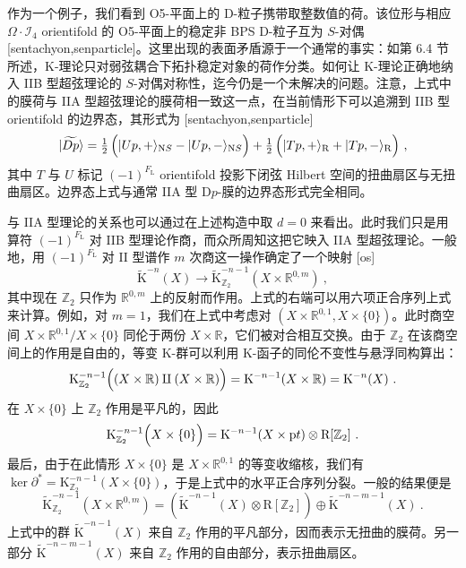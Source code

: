 \documentclass[11pt,a4paper]{ctexart}
\begin{document}
作为一个例子，我们看到 O5-平面上的 D-粒子携带取整数值的荷。该位形与相应 \(\Omega\cdot{\mathcal I}_4\) orientifold 的 O5-平面上的稳定非 BPS D-粒子互为 \(S\)-对偶 [sentachyon,senparticle]。这里出现的表面矛盾源于一个通常的事实：如第 6.4 节所述，K-理论只对弱弦耦合下拓扑稳定对象的荷作分类。如何让 K-理论正确地纳入 IIB 型超弦理论的 \(S\)-对偶对称性，迄今仍是一个未解决的问题。注意，上式中的膜荷与 IIA 型超弦理论的膜荷相一致这一点，在当前情形下可以追溯到 IIB 型 orientifold 的边界态，其形式为 [sentachyon,senparticle] \[|\widetilde{Dp}\rangle
=\mbox{$\frac{1}{2}$}\,\Bigl(|Up,+\rangle_{{\mathrm NS}}-|Up,-\rangle_{{\mathrm NS}}\Bigr)
+\mbox{$\frac{1}{2}$}\,\Bigl(|Tp,+\rangle_{{\mathrm R}}+|Tp,-\rangle_{{\mathrm R}}\Bigr)\ ,\] 其中 \(T\) 与 \(U\) 标记 \({(-1)^{F_{\mathrm L}}}\) orientifold 投影下闭弦 Hilbert 空间的扭曲扇区与无扭曲扇区。边界态上式与通常 IIA 型 D\(p\)-膜的边界态形式完全相同。

与 IIA 型理论的关系也可以通过在上述构造中取 \(d=0\) 来看出。此时我们只是用算符 \({(-1)^{F_{\mathrm L}}}\) 对 IIB 型理论作商，而众所周知这把它映入 IIA 型超弦理论。一般地，用 \({(-1)^{F_{\mathrm L}}}\) 对 II 型谱作 \(m\) 次商这一操作确定了一个映射 [os] \[\widetilde{{\mathrm K}}^{-n}(X)\longrightarrow\widetilde{{\mathrm K}}^{-n-1}_{{\mathbb{Z}}_2}(X\times{\mathbb{R}}^{0,m})\ ,\] 其中现在 \({\mathbb{Z}}_2\) 只作为 \({\mathbb{R}}^{0,m}\) 上的反射而作用。上式的右端可以用六项正合序列上式来计算。例如，对 \(m=1\)，我们在上式中考虑对 \((X\times{\mathbb{R}}^{0,1}, X\times\{0\})\)。此时商空间 \(X\times{\mathbb{R}}^{0,1}/X\times\{0\}\) 同伦于两份 \(X\times{\mathbb{R}}\)，它们被对合相互交换。由于 \({\mathbb{Z}}_2\) 在该商空间上的作用是自由的，等变 K-群可以利用 K-函子的同伦不变性与悬浮同构算出： \[{\mathrm K}_{{\mathbb{Z}}_2}^{-n-1}\Bigl((X\times{\mathbb{R}})\amalg(X\times{\mathbb{R}})\Bigr)
={\mathrm K}^{-n-1}(X\times{\mathbb{R}})={\mathrm K}^{-n}(X)\ .\] 在 \(X\times\{0\}\) 上 \({\mathbb{Z}}_2\) 作用是平凡的，因此 \[{\mathrm K}_{{\mathbb{Z}}_2}^{-n-1}\Bigl(X\times\{0\}\Bigr)={\mathrm K}^{-n-1}(X\times{\mathrm pt})\otimes
{\mathrm R}[{\mathbb{Z}}_2]\ .\] 最后，由于在此情形 \(X\times\{0\}\) 是 \(X\times{\mathbb{R}}^{0,1}\) 的等变收缩核，我们有 \(\ker\partial^*={\mathrm K}_{{\mathbb{Z}}_2}^{-n-1}(X\times\{0\})\)，于是上式中的水平正合序列分裂。一般的结果便是 \[\widetilde{{\mathrm K}}^{-n-1}_{{\mathbb{Z}}_2}(X\times{\mathbb{R}}^{0,m})
=\left(\widetilde{{\mathrm K}}^{-n-1}(X)\otimes {\mathrm
R}[{\mathbb{Z}}_2]\right)\oplus\widetilde{{\mathrm K}}^{-n-m-1}(X)
\ .\] 上式中的群 \(\widetilde{{\mathrm K}}^{-n-1}(X)\) 来自 \({\mathbb{Z}}_2\) 作用的平凡部分，因而表示无扭曲的膜荷。另一部分 \(\widetilde{{\mathrm K}}^{-n-m-1}(X)\) 来自 \({\mathbb{Z}}_2\) 作用的自由部分，表示扭曲扇区。
\end{document}
